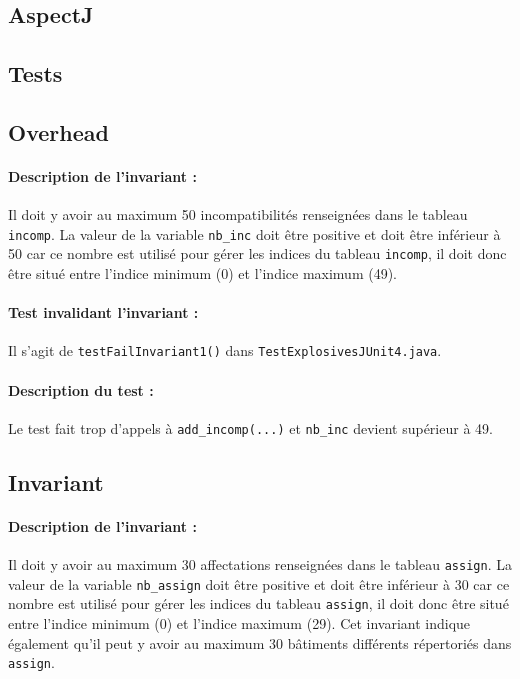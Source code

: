 \documentclass{article}
\begin{document}
\subsection{AspectJ}

\subsection{Tests}

\subsection{Overhead}

\newpage

\paragraph{Description de l'invariant :} Il doit y avoir au maximum 50 incompatibilités renseignées dans le tableau \texttt{incomp}. La valeur de la variable \texttt{nb\_inc} doit être positive et doit être inférieur à 50 car ce nombre est utilisé pour gérer les indices du tableau \texttt{incomp}, il doit donc être situé entre l'indice minimum (0) et l'indice maximum (49).

\vspace{-0.2cm}
\paragraph{Test invalidant l'invariant :} Il s'agit de \texttt{testFailInvariant1()} dans \texttt{TestExplosivesJUnit4.java}.

\vspace{-0.2cm}
\paragraph{Description du test :} Le test fait trop d'appels à \texttt{add\_incomp(...)} et \texttt{nb\_inc} devient supérieur à 49.  

\subsection{Invariant }

\paragraph{Description de l'invariant :} Il doit y avoir au maximum 30 affectations renseignées dans le tableau \texttt{assign}. La valeur de la variable \texttt{nb\_assign} doit être positive et doit être inférieur à 30 car ce nombre est utilisé pour gérer les indices du tableau \texttt{assign}, il doit donc être situé entre l'indice minimum (0) et l'indice maximum (29). Cet invariant indique également qu'il peut y avoir au maximum 30 bâtiments différents répertoriés dans \texttt{assign}.
\end{document}
